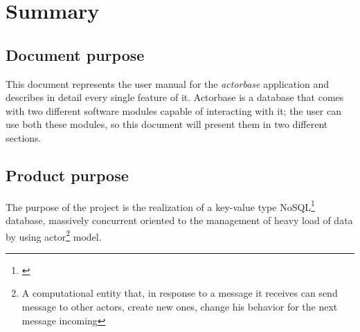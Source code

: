 \documentclass{scalatekids-article}
\begin{document}
\section{Summary}

\subsection{Document purpose}
This document represents the user manual for the \textit{actorbase} application
and describes in detail every single feature of it. Actorbase is a database that
comes with two different software modules capable of interacting with it; the
user can use both these modules, so this document will present them in two
different sections.

\subsection{Product purpose}

The purpose of the project is the realization of a key-value type
NoSQL\footnote{\label{nosql}} database, massively concurrent oriented to the
management of heavy load of data by using actor\footnote{A computational entity
that, in response to a message it receives can send message to other actors,
create new ones, change his behavior for the next message incoming\label{actor}}
model.






\end{document}

